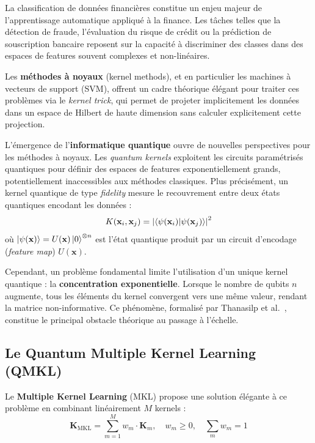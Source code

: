 \documentclass[12pt,a4paper]{article}
\newcommand{\K}{\mathbf{K}}
\newcommand{\x}{\mathbf{x}}
\begin{document}
La classification de données financières constitue un enjeu majeur de l'apprentissage automatique appliqué à la finance. Les tâches telles que la détection de fraude, l'évaluation du risque de crédit ou la prédiction de souscription bancaire reposent sur la capacité à discriminer des classes dans des espaces de features souvent complexes et non-linéaires.

Les \textbf{méthodes à noyaux} (kernel methods), et en particulier les machines à vecteurs de support (SVM), offrent un cadre théorique élégant pour traiter ces problèmes via le \textit{kernel trick}, qui permet de projeter implicitement les données dans un espace de Hilbert de haute dimension sans calculer explicitement cette projection.

L'émergence de l'\textbf{informatique quantique} ouvre de nouvelles perspectives pour les méthodes à noyaux. Les \textit{quantum kernels} exploitent les circuits paramétrisés quantiques pour définir des espaces de features exponentiellement grands, potentiellement inaccessibles aux méthodes classiques. Plus précisément, un kernel quantique de type \textit{fidelity} mesure le recouvrement entre deux états quantiques encodant les données :
\begin{equation}
K(\x_i, \x_j) = \left| \braket{\psi(\x_i) | \psi(\x_j)} \right|^2
\label{eq:fidelity_kernel}
\end{equation}
où $\ket{\psi(\x)} = U(\x)\ket{0}^{\otimes n}$ est l'état quantique produit par un circuit d'encodage (\textit{feature map}) $U(\x)$.

Cependant, un problème fondamental limite l'utilisation d'un unique kernel quantique : la \textbf{concentration exponentielle}. Lorsque le nombre de qubits $n$ augmente, tous les éléments du kernel convergent vers une même valeur, rendant la matrice non-informative. Ce phénomène, formalisé par Thanasilp et al.~\cite{thanasilp2024}, constitue le principal obstacle théorique au passage à l'échelle.

\subsection{Le Quantum Multiple Kernel Learning (QMKL)}

Le \textbf{Multiple Kernel Learning} (MKL) propose une solution élégante à ce problème en combinant linéairement $M$ kernels :
\begin{equation}
\K_{\text{MKL}} = \sum_{m=1}^{M} w_m \cdot \K_m, \quad w_m \geq 0, \quad \sum_m w_m = 1
\label{eq:mkl}
\end{equation}
\end{document}
